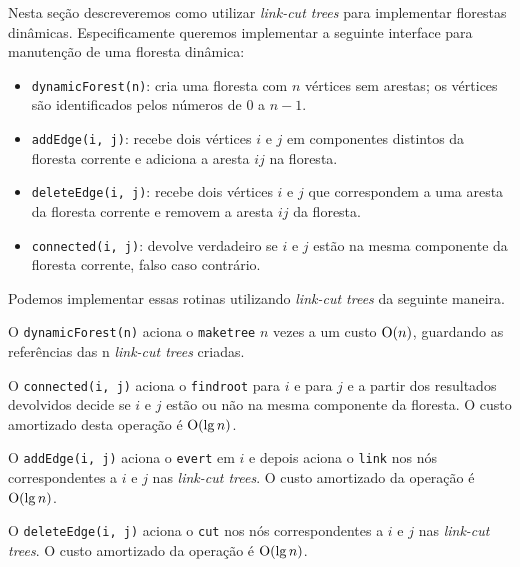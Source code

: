 Nesta seção descreveremos como utilizar \emph{link-cut trees} para implementar florestas dinâmicas. Especificamente queremos implementar a seguinte interface para manutenção de uma floresta dinâmica:

\begin{itemize}
    \item \texttt{dynamicForest(n)}: cria uma floresta com $n$ vértices sem arestas; os vértices são identificados pelos números de $0$ a $n-1$.  
    \item \texttt{addEdge(i, j)}: recebe dois vértices $i$ e $j$ em componentes distintos da floresta corrente e adiciona a aresta $ij$ na floresta.  
    \item \texttt{deleteEdge(i, j)}: recebe dois vértices $i$ e $j$ que correspondem a uma aresta da floresta corrente e removem a aresta $ij$ da floresta.  
    \item \texttt{connected(i, j)}: devolve verdadeiro se $i$ e $j$ estão na mesma componente da floresta corrente, falso caso contrário.  
\end{itemize}


Podemos implementar essas rotinas utilizando \emph{link-cut trees} da seguinte maneira.

O \texttt{dynamicForest(n)} aciona o \texttt{maketree} $n$ vezes a um custo $\mathrm{O}(n)$, guardando as referências das n \emph{link-cut trees} criadas.  

O \texttt{connected(i, j)} aciona o \texttt{findroot} para $i$ e para $j$ e a partir dos resultados devolvidos decide se $i$ e $j$ estão ou não na mesma componente da floresta. O custo amortizado desta operação é $\mathrm{O}(\lg n)$.  

O \texttt{addEdge(i, j)} aciona o \texttt{evert} em $i$ e depois aciona o \texttt{link} nos nós correspondentes a $i$ e $j$ nas \emph{link-cut trees}. O custo amortizado da operação é $\mathrm{O}(\lg n)$.  

O \texttt{deleteEdge(i, j)} aciona o \texttt{cut} nos nós correspondentes a $i$ e $j$ nas \emph{link-cut trees}. O custo amortizado da operação é $\mathrm{O}(\lg n)$.  

